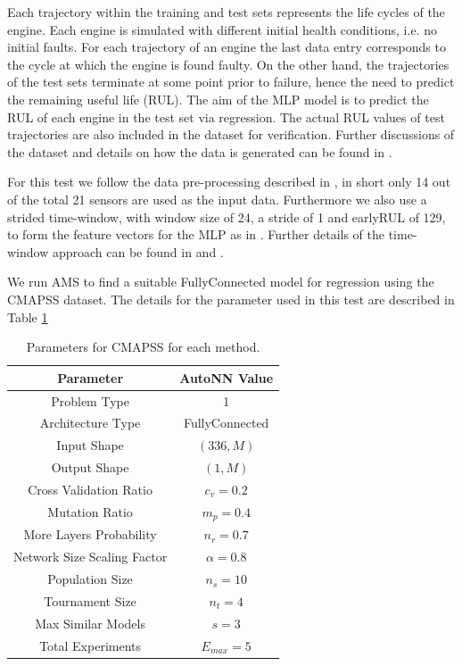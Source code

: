 \documentclass[journal]{IEEEtran}
\begin{document}
Each trajectory within the training and test sets represents the life cycles of the engine. Each engine is simulated with different initial health conditions, i.e. no initial faults. For each trajectory of an engine the last data entry corresponds to the cycle at which the engine is found faulty. On the other hand, the trajectories of the test sets terminate at some point prior to failure, hence the need to predict the remaining useful life (RUL). The aim of the MLP model is to predict the RUL of each engine in the test set via regression. The actual RUL values of test trajectories are also included in the dataset for verification. Further discussions of the dataset and details on how the data is generated can be found in \cite{Saxena2008}.

For this test we follow the data pre-processing described in \cite{Laredo2018}, in short only 14 out of the total 21 sensors are used as the input data. Furthermore we also use a strided time-window, with window size of 24, a stride of 1 and earlyRUL of 129, to form the feature vectors for the MLP as in \cite{Laredo2018}. Further details of the time-window approach can be found in \cite{Laredo2018} and \cite{Li2018}.

We run AMS to find a suitable FullyConnected model for regression using the CMAPSS dataset. The details for the parameter used in this test are described in Table \ref{table:CMAPSS_params}

\begin{table}[!htb]
\begin{center}
\begin{tabular}{| c | c |}
\hline
Parameter & AutoNN Value \\
\hline
Problem Type & 1 \\
Architecture Type & FullyConnected \\
Input Shape & $(336, M)$  \\
Output Shape & $(1, M)$ \\
Cross Validation Ratio & $c_v = 0.2$ \\
Mutation Ratio & $m_p = 0.4$ \\
More Layers Probability & $n_r = 0.7$ \\
Network Size Scaling Factor & $\alpha = 0.8$ \\
Population Size & $n_s = 10$ \\
Tournament Size & $n_t = 4$ \\
Max Similar Models & $s = 3$ \\
Total Experiments & $E_{max} = 5$ \\
\hline
\end{tabular}
\end{center}
\caption{Parameters for CMAPSS for each method.}
\label{table:CMAPSS_params}
\end{table}
\end{document}
